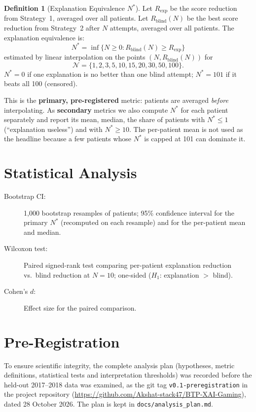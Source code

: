 \documentclass[12pt, a4paper, oneside]{report}
\theoremstyle{definition}
\newtheorem{definition}{Definition}[chapter]
\begin{document}
\begin{definition}[Explanation Equivalence $N^*$]
  Let $R_{\text{exp}}$ be the score reduction from Strategy~1, averaged
  over all patients. Let $R_{\text{blind}}(N)$ be the best score
  reduction from Strategy~2 after $N$ attempts, averaged over all
  patients. The explanation equivalence is:
  \[
    N^* = \inf \bigl\{ N \geq 0 : R_{\text{blind}}(N) \geq R_{\text{exp}} \bigr\}
  \]
  estimated by linear interpolation on the points $(N, R_{\text{blind}}(N))$ for
  \[\mathcal{N} = \{1,2,3,5,10,15,20,30,50,100\}.\] $N^* = 0$ if one
  explanation is no better than one blind attempt; $N^* = 101$ if it beats
  all 100 (censored).
\end{definition}

This is the \textbf{primary, pre-registered} metric: patients are
averaged \emph{before} interpolating. As \textbf{secondary} metrics we
also compute $N^*$ for each patient separately and report its mean,
median, the share of patients with $N^* \leq 1$ (``explanation
useless'') and with $N^* \geq 10$. The per-patient mean is not used as
the headline because a few patients whose $N^*$ is capped at 101 can
dominate it.

\section{Statistical Analysis}

\begin{description}
  \item[Bootstrap CI:] 1{,}000 bootstrap resamples of patients; 95\%
       confidence interval for the primary $N^*$ (recomputed on each
       resample) and for the per-patient mean and median.
  \item[Wilcoxon test:] Paired signed-rank test comparing per-patient
       explanation reduction vs.\ blind reduction at $N=10$;
       one-sided ($H_1$: explanation $>$ blind).
  \item[Cohen's $d$:] Effect size for the paired comparison.
\end{description}

\section{Pre-Registration}

To ensure scientific integrity, the complete analysis plan (hypotheses,
metric definitions, statistical tests and interpretation thresholds) was
recorded before the held-out 2017--2018 data was examined, as
the git tag \texttt{v0.1-preregistration} in the project repository
(\url{https://github.com/Akshat-stack47/BTP-XAI-Gaming}), dated 28 October 2026. The plan is kept in
\texttt{docs/analysis\_plan.md}.
\end{document}
